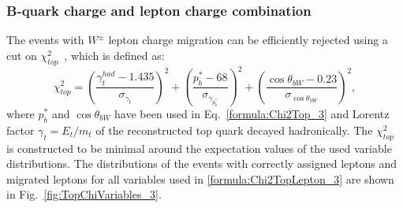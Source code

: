 \subsubsection{B-quark charge and lepton charge combination}
\label{sec:TopJetChargeCombo}
The events with $W^\pm$ lepton charge migration can be efficiently rejected using  a cut on $\chi^2_{top}$~\cite{bib:Jeremy}, which is defined as:
\begin{equation}
	\label{formula:Chi2TopLepton_3}
	\chi^2_{top} = (\frac{\gamma_t^{had}-1.435}{\sigma_{\gamma_{t}}})^2 + (\frac{p^*_b-68}{\sigma_{\gamma_{p^*_b}}})^2 + (\frac{\cos\theta_{bW} - 0.23}{\sigma_{\cos\theta_{bW}}})^2,
\end{equation}
where $p^*_b$ and $\cos\theta_{bW}$ have been used in Eq.~\ref{formula:Chi2Top_3} and Lorentz factor $\gamma_t=E_{t}/m_{t}$ of the reconstructed top quark decayed hadronically. The $\chi^2_{top}$ is constructed to be minimal around the expectation values of the used variable distributions.
The distributions of the events with correctly assigned leptons and migrated leptons for all variables used in \ref{formula:Chi2TopLepton_3} are shown in Fig.~\ref{fig:TopChiVariables_3}.


